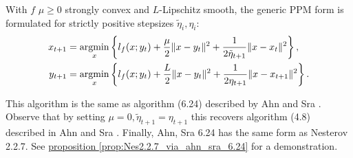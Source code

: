 \documentclass[12pt]{article}
\begin{document}
            \begin{definition}\label{def:agg_ppm}
                With $f$ $\mu \ge 0$ strongly convex and $L$-Lipschitz smooth, the generic PPM form is formulated for strictly positive stepsizes $\tilde \eta_i,\eta_i$: 
                \begin{align*}
                    x_{t + 1} &= \mathop{\rm argmin}\limits_{x} \left\lbrace
                        l_f(x; y_t) 
                        + 
                        \frac{\mu}{2}\Vert x - y_t\Vert^2
                        + 
                        \frac{1}{2\tilde \eta_{t + 1}} \Vert x - x_t\Vert^2
                    \right\rbrace, 
                    \\
                    y_{t + 1} &= \mathop{\rm argmin}\limits_{x} 
                    \left\lbrace
                        l_f(x; y_t) + \frac{L}{2}\Vert x - y_t\Vert^2 + 
                        \frac{1}{2\eta_{t + 1}}\Vert x - x_{t + 1}\Vert^2
                    \right\rbrace. 
                \end{align*}
            \end{definition}
            \begin{remark}
                This algorithm is the same as algorithm (6.24) described by Ahn and Sra \cite{ahn_understanding_2022}. 
                Observe that by setting $\mu = 0, \tilde \eta_{t + 1} = \eta_{t + 1}$ this recovers algorithm (4.8) described in Ahn and Sra \cite{ahn_understanding_2022}. 
                Finally, Ahn, Sra 6.24 has the same form as Nesterov 2.2.7. 
                See 
                \hyperref[prop:Nes2.2.7_via_ahn_sra_6.24]{proposition \ref*{prop:Nes2.2.7_via_ahn_sra_6.24}} for a demonstration. 
            \end{remark}
\end{document}
